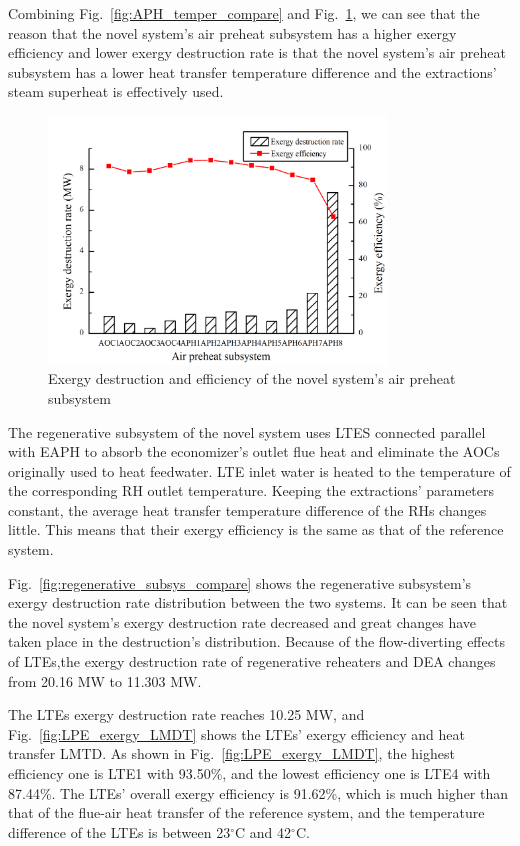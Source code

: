 \documentclass[preprint,12pt]{elsarticle}
\begin{document}
Combining Fig.~\ref{fig:APH_temper_compare} and Fig.~\ref{fig:novel_APH_exergy}, we can see that the reason that the novel system's air preheat subsystem has a higher exergy efficiency and lower exergy destruction rate is that the novel system's air preheat subsystem has a lower heat transfer temperature difference and the extractions' steam superheat is effectively used.


\begin{figure}[htbp]
\centering
\includegraphics[width=0.8\textwidth]{fig/novel_APH_exergy.png}
\caption{Exergy destruction and efficiency of the novel system's air preheat subsystem} 
\label{fig:novel_APH_exergy}
\end{figure}

The regenerative subsystem of the novel system uses LTES connected parallel with EAPH to absorb the economizer's outlet flue heat and eliminate the AOCs originally used to heat feedwater.
LTE inlet water is heated to the temperature of the corresponding RH outlet temperature.
Keeping the extractions' parameters constant, the average heat transfer temperature difference of the RHs changes little.
This means that their exergy efficiency is the same as that of the reference system.

Fig.~\ref{fig:regenerative_subsys_compare} shows the regenerative subsystem's exergy destruction rate distribution between the two systems.
It can be seen that the novel system's exergy destruction rate decreased and great changes have taken place in the destruction's distribution.
Because of the flow-diverting effects of LTEs,the exergy destruction rate of regenerative reheaters and DEA changes from 20.16 MW to 11.303 MW.

The LTEs exergy destruction rate reaches 10.25 MW, and Fig.~\ref{fig:LPE_exergy_LMDT} shows the LTEs' exergy efficiency and heat transfer LMTD.
As shown in Fig.~\ref{fig:LPE_exergy_LMDT}, the highest efficiency one is LTE1 with 93.50\%, and the lowest efficiency one is LTE4 with 87.44\%. 
The LTEs' overall exergy efficiency is 91.62\%, which is much higher than that of the flue-air heat transfer of the reference system, and the temperature difference of the LTEs is between 23$^\circ$C and 42$^\circ$C.
\end{document}
